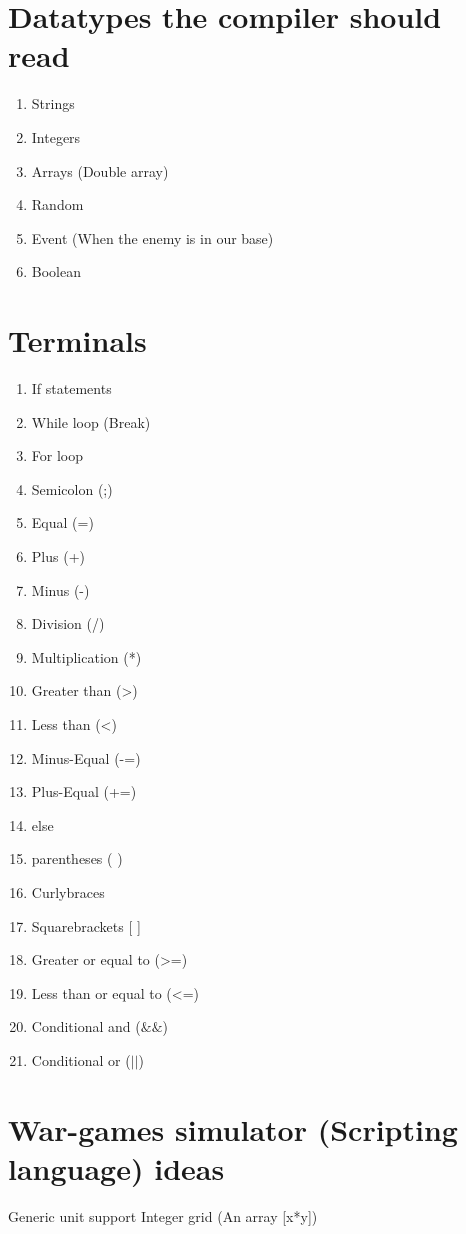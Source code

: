


\section*{Datatypes the compiler should read}

\begin{enumerate}
	\item Strings
	\item Integers
	\item Arrays (Double array)
	\item Random
	\item Event (When the enemy is in our base)
	\item Boolean
\end{enumerate}


\section*{Terminals}
\begin{enumerate}

	\item If statements
	\item While loop (Break)
	\item For loop	
	\item Semicolon (;)
	\item Equal (=)
	\item Plus (+)
	\item Minus (-)
	\item Division (/)
	\item Multiplication (*)
	\item Greater than (>)
	\item Less than (<)
	\item Minus-Equal (-=)
	\item Plus-Equal (+=)
	\item else 
	\item parentheses ( )
	\item Curlybraces { }
	\item Squarebrackets [ ]
	\item Greater or equal to (>=)
	\item Less than or equal to (<=)
	\item Conditional and ($\&\&$)
	\item Conditional or ($||$)
	
\end{enumerate}

\section*{War-games simulator (Scripting language) ideas}

Generic unit support
Integer grid (An array [x*y])



